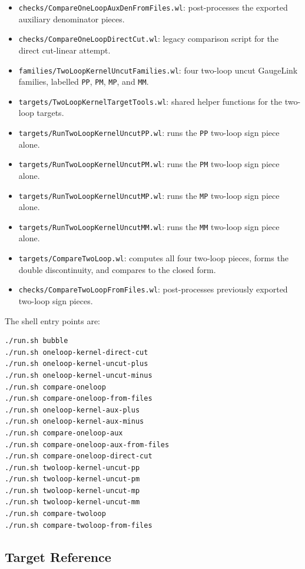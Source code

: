 \documentclass[11pt]{article}
\newcommand{\WL}[1]{\texttt{#1}}
\begin{document}
\begin{itemize}
  \item \WL{checks/CompareOneLoopAuxDenFromFiles.wl}: post-processes the
        exported auxiliary denominator pieces.
  \item \WL{checks/CompareOneLoopDirectCut.wl}: legacy comparison script for
        the direct cut-linear attempt.
  \item \WL{families/TwoLoopKernelUncutFamilies.wl}: four two-loop uncut
        GaugeLink families, labelled \WL{PP}, \WL{PM}, \WL{MP}, and \WL{MM}.
  \item \WL{targets/TwoLoopKernelTargetTools.wl}: shared helper functions for
        the two-loop targets.
  \item \WL{targets/RunTwoLoopKernelUncutPP.wl}: runs the \WL{PP} two-loop
        sign piece alone.
  \item \WL{targets/RunTwoLoopKernelUncutPM.wl}: runs the \WL{PM} two-loop
        sign piece alone.
  \item \WL{targets/RunTwoLoopKernelUncutMP.wl}: runs the \WL{MP} two-loop
        sign piece alone.
  \item \WL{targets/RunTwoLoopKernelUncutMM.wl}: runs the \WL{MM} two-loop
        sign piece alone.
  \item \WL{targets/CompareTwoLoop.wl}: computes all four two-loop pieces,
        forms the double discontinuity, and compares to the closed form.
  \item \WL{checks/CompareTwoLoopFromFiles.wl}: post-processes previously
        exported two-loop sign pieces.
\end{itemize}
The shell entry points are:
\begin{verbatim}
./run.sh bubble
./run.sh oneloop-kernel-direct-cut
./run.sh oneloop-kernel-uncut-plus
./run.sh oneloop-kernel-uncut-minus
./run.sh compare-oneloop
./run.sh compare-oneloop-from-files
./run.sh oneloop-kernel-aux-plus
./run.sh oneloop-kernel-aux-minus
./run.sh compare-oneloop-aux
./run.sh compare-oneloop-aux-from-files
./run.sh compare-oneloop-direct-cut
./run.sh twoloop-kernel-uncut-pp
./run.sh twoloop-kernel-uncut-pm
./run.sh twoloop-kernel-uncut-mp
./run.sh twoloop-kernel-uncut-mm
./run.sh compare-twoloop
./run.sh compare-twoloop-from-files
\end{verbatim}

\subsection*{Target Reference}
\end{document}
